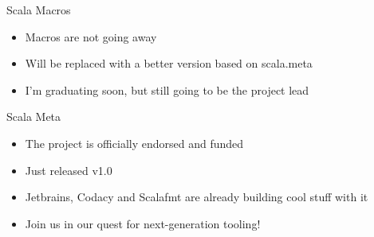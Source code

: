 \documentclass[svgnames,dvipsnames,hyperref={bookmarks=false},usepdftitle=false]{beamer}
\begin{document}

\begin{frame}{Scala Macros}
\begin{itemize}
\item Macros are not going away
\item Will be replaced with a better version based on scala.meta
\item I'm graduating soon, but still going to be the project lead
\end{itemize}
\end{frame}

\begin{frame}{Scala Meta}
\begin{itemize}
\item The project is officially endorsed and funded
\item Just released v1.0
\item Jetbrains, Codacy and Scalafmt are already building cool stuff with it
\item Join us in our quest for next-generation tooling!
\end{itemize}
\end{frame}
\end{document}
